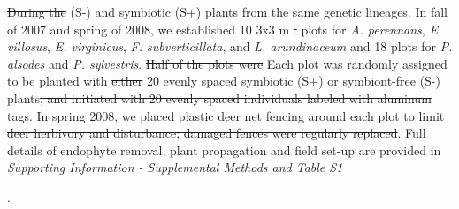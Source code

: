 \documentclass[lineno,sn-nature]{sn-jnl}%
\providecommand{\DIFadd}[1]{{\protect\color{blue}#1}} %
\providecommand{\DIFdel}[1]{{\protect\color{red}\protect\scriptsize\sout{#1}}}
\providecommand{\DIFadd}[1]{{\protect\color{blue}\uwave{#1}}} %
\providecommand{\DIFdel}[1]{{\protect\color{red}\sout{#1}}}                      %
\providecommand{\DIFaddbegin}{} %
\providecommand{\DIFaddend}{} %
\providecommand{\DIFdelbegin}{} %
\providecommand{\DIFdelend}{} %
\newcommand{\DIFscaledelfig}{0.5}
\newlength{\DIFdelgraphicswidth} %
\newlength{\DIFdelgraphicsheight} %
\newcommand{\DIFaddincludegraphics}[2][]{{\color{blue}\fbox{\DIFOincludegraphics[#1]{#2}}}} %
\newcommand{\DIFdelincludegraphics}[2][]{%
\sbox{\DIFdelgraphicsbox}{\DIFOincludegraphics[#1]{#2}}%
\settoboxwidth{\DIFdelgraphicswidth}{\DIFdelgraphicsbox} %
\settoboxtotalheight{\DIFdelgraphicsheight}{\DIFdelgraphicsbox} %
\scalebox{\DIFscaledelfig}{%
\parbox[b]{\DIFdelgraphicswidth}{\usebox{\DIFdelgraphicsbox}\\[-\baselineskip] \rule{\DIFdelgraphicswidth}{0em}}\llap{\resizebox{\DIFdelgraphicswidth}{\DIFdelgraphicsheight}{%
\setlength{\unitlength}{\DIFdelgraphicswidth}%
\begin{picture}(1,1)%
\thicklines\linethickness{2pt} %
{\color[rgb]{1,0,0}\put(0,0){\framebox(1,1){}}}%
{\color[rgb]{1,0,0}\put(0,0){\line( 1,1){1}}}%
{\color[rgb]{1,0,0}\put(0,1){\line(1,-1){1}}}%
\end{picture}%
}\hspace*{3pt}}} %
} %
\DeclareRobustCommand{\DIFaddbegin}{\DIFOaddbegin \let\includegraphics\DIFaddincludegraphics} %
\DeclareRobustCommand{\DIFaddend}{\DIFOaddend \let\includegraphics\DIFOincludegraphics} %
\DeclareRobustCommand{\DIFdelbegin}{\DIFOdelbegin \let\includegraphics\DIFdelincludegraphics} %
\DeclareRobustCommand{\DIFdelend}{\DIFOaddend \let\includegraphics\DIFOincludegraphics} %
\begin{document}
\DIFdel{During the }\DIFdelend \DIFaddbegin \DIFadd{(S-) and symbiotic (S+) plants from the same genetic lineages.
	In }\DIFaddend fall of 2007 and spring of 2008, we established 10 3x3 m \DIFdelbegin \DIFdel{. }\DIFdelend plots for \emph{A. perennans}, \emph{E. villosus}, \emph{E. virginicus}, \emph{F. subverticillata}, and \emph{L. arundinaceum}  and 18 plots for \emph{P. alsodes} and \emph{P. sylvestris}.
	\DIFdelbegin \DIFdel{Half of the plots were }\DIFdelend \DIFaddbegin \DIFadd{Each plot was }\DIFaddend randomly assigned to be planted with \DIFdelbegin \DIFdel{either }\DIFdelend \DIFaddbegin \DIFadd{20 evenly spaced }\DIFaddend symbiotic (S+) or symbiont-free (S-) plants\DIFdelbegin \DIFdel{, and initiated with 20 evenly spaced individuals labeled with aluminum tags.
	In spring 2008, we placed plastic deer net fencing around each plot to limit deer herbivory and disturbance; damaged fences were regularly replaced}\DIFdelend .
	\DIFaddbegin \DIFadd{Full details of endophyte removal, plant propagation and field set-up are provided in }\emph{\DIFadd{Supporting Information - Supplemental Methods and Table S1}}\DIFadd{.
	
}\DIFaddend 

	
\end{document}
